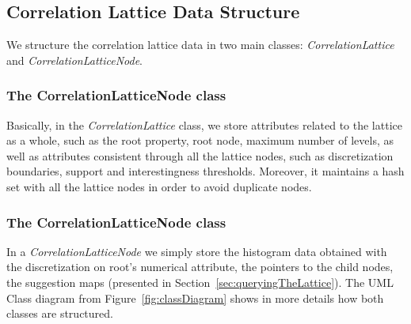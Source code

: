 \subsection{Correlation Lattice Data Structure}

We structure the correlation lattice data in two main classes: \emph{CorrelationLattice} and
\emph{CorrelationLatticeNode}. 

\subsubsection{The CorrelationLatticeNode class}

Basically, in the \emph{CorrelationLattice} class, we store attributes related to the lattice as
a whole, such as the root property, root node, maximum number of levels, as well as attributes consistent through all
the lattice nodes, such as discretization boundaries, support and interestingness thresholds. Moreover, it maintains a
hash set with all the lattice nodes in order to avoid duplicate nodes.

\subsubsection{The CorrelationLatticeNode class}

In a \emph{CorrelationLatticeNode} we simply store the histogram data obtained with the discretization on root's
numerical attribute, the pointers to the child nodes, the suggestion maps (presented in
Section~\ref{sec:queryingTheLattice}). The UML Class diagram from Figure~\ref{fig:classDiagram} shows in more details
how both classes are structured.

